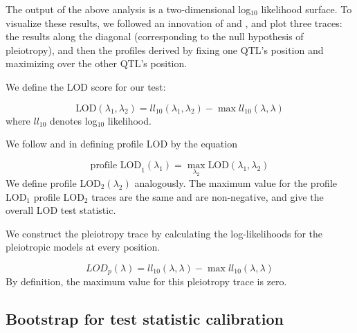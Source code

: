 \documentclass[oneside]{book}\usepackage[]{graphicx}\usepackage[]{color}
\begin{document}
The output of the above analysis is a two-dimensional log$_{10}$ likelihood
surface. To visualize these results, we followed an innovation of \citet{zeng2000genetic} and
\citet{tian2016dissection}, and plot three traces: the results along the
diagonal (corresponding to the null hypothesis of pleiotropy), and
then the profiles derived by fixing one QTL's position
and maximizing over the other QTL's position.

We define the LOD score for our test:

\begin{equation}
\text{LOD}(\lambda_1, \lambda_2) = ll_{10}(\lambda_1, \lambda_2) - \max ll_{10}(\lambda, \lambda)
\label{eq:lodpvl}
\end{equation}
where $ll_{10}$ denotes log$_{10}$ likelihood.

We follow \citet{zeng2000genetic} and \citet{tian2016dissection} in
defining profile LOD by the equation

\begin{equation}
\text{profile LOD}_1(\lambda_1) = \max_{\lambda_2}\text{LOD}(\lambda_1, \lambda_2)
\label{eq:profilelod}
\end{equation}
We define profile LOD$_2(\lambda_2)$ analogously.
The maximum value for the profile LOD$_1$
profile LOD$_2$ traces are the same and are non-negative, and give the
overall LOD test statistic.

We construct the pleiotropy trace by calculating the log-likelihoods
for the pleiotropic models at every position.

\begin{equation}
LOD_{p}(\lambda) = ll_{10}(\lambda, \lambda) - \max ll_{10}(\lambda, \lambda)
\label{eq:lodp}
\end{equation}
By definition, the maximum value for this pleiotropy trace
is zero.






\subsection{Bootstrap for test statistic calibration}
\end{document}
